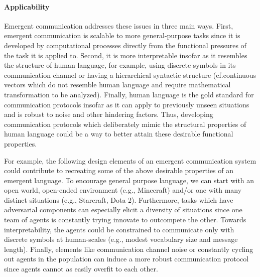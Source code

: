 \paragraph{Applicability}
Emergent communication addresses these issues in three main ways.
First, emergent communication is scalable to more general-purpose tasks since it is developed by computational processes directly from the functional pressures of the task it is applied to.
Second, it is more interpretable insofar as it resembles the structure of human language, for example, using discrete symbols in its communication channel or having a hierarchical syntactic structure (cf.\@  continuous vectors which do not resemble human language and require mathematical transformation to be analyzed).
Finally, human language is the gold standard for communication protocols insofar as it can apply to previously unseen situations and is robust to noise and other hindering factors.
Thus, developing communication protocols which deliberately mimic the structural properties of human language could be a way to better attain these desirable functional properties.

For example, the following design elements of an emergent communication system could contribute to recreating some of the above desirable properties of an emergent language.
To encourage general purpose language, we can start with an open world, open-ended environment (e.g., Minecraft) and/or one with many distinct situations (e.g., Starcraft, Dota 2).
Furthermore, tasks which have adversarial components can especially elicit a diversity of situations since one team of agents is constantly trying innovate to outcompete the other.
Towards interpretability, the agents could be constrained to communicate only with discrete symbols at human-scales (e.g., modest vocabulary size and message length).
Finally, elements like communication channel noise or constantly cycling out agents in the population can induce a more robust communication protocol since agents cannot as easily overfit to each other.


